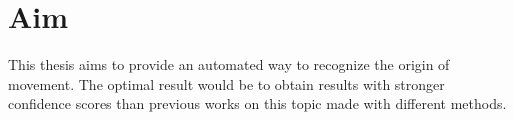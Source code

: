 \section{Aim}


This thesis aims to provide an automated way to recognize the origin of movement. The optimal result would be to obtain results with stronger confidence scores than previous works on this topic made with different methods.